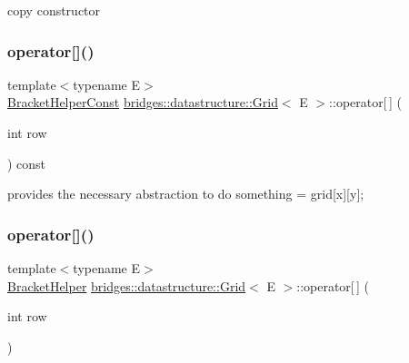 copy constructor \mbox{\label{classbridges_1_1datastructure_1_1_grid_a754a890728b6b268a1ba843da89cb1f6}} 
\subsubsection{\texorpdfstring{operator[]()}{operator[]()}\hspace{0.1cm}{\footnotesize\ttfamily [1/2]}}
{\footnotesize\ttfamily template$<$typename E$>$ \\
\hyperlink{classbridges_1_1datastructure_1_1_grid_1_1_bracket_helper_const}{Bracket\+Helper\+Const} \hyperlink{classbridges_1_1datastructure_1_1_grid}{bridges\+::datastructure\+::\+Grid}$<$ E $>$\+::operator\mbox{[}$\,$\mbox{]} (\begin{DoxyParamCaption}\item[{int}]{row }\end{DoxyParamCaption}) const\hspace{0.3cm}{\ttfamily [inline]}}



provides the necessary abstraction to do something = grid\mbox{[}x\mbox{]}\mbox{[}y\mbox{]}; 

\mbox{\label{classbridges_1_1datastructure_1_1_grid_ae5a7cf159c7918193ba75146660c3c1f}} 
\subsubsection{\texorpdfstring{operator[]()}{operator[]()}\hspace{0.1cm}{\footnotesize\ttfamily [2/2]}}
{\footnotesize\ttfamily template$<$typename E$>$ \\
\hyperlink{classbridges_1_1datastructure_1_1_grid_1_1_bracket_helper}{Bracket\+Helper} \hyperlink{classbridges_1_1datastructure_1_1_grid}{bridges\+::datastructure\+::\+Grid}$<$ E $>$\+::operator\mbox{[}$\,$\mbox{]} (\begin{DoxyParamCaption}\item[{int}]{row }\end{DoxyParamCaption})\hspace{0.3cm}{\ttfamily [inline]}}



